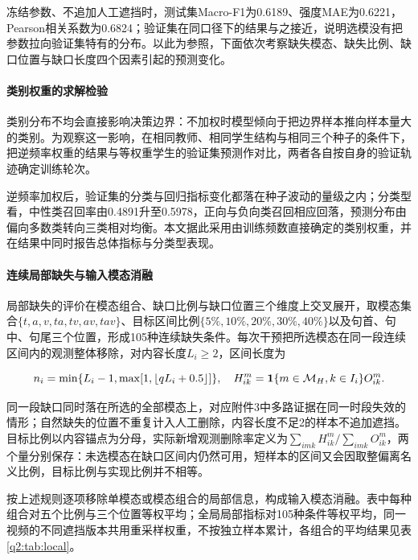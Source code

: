 冻结参数、不追加人工遮挡时，测试集Macro-F1为0.6189、强度MAE为0.6221，Pearson相关系数为0.6824；验证集在同口径下的结果与之接近，说明选模没有把参数拉向验证集特有的分布。以此为参照，下面依次考察缺失模态、缺失比例、缺口位置与缺口长度四个因素引起的预测变化。

\paragraph{类别权重的求解检验}

类别分布不均会直接影响决策边界：不加权时模型倾向于把边界样本推向样本量大的类别。为观察这一影响，在相同教师、相同学生结构与相同三个种子的条件下，把逆频率权重的结果与等权重学生的验证集预测作对比，两者各自按自身的验证轨迹确定训练轮次。

逆频率加权后，验证集的分类与回归指标变化都落在种子波动的量级之内；分类型看，中性类召回率由0.4891升至0.5978，正向与负向类召回相应回落，预测分布由偏向多数类转向三类相对均衡。本文据此采用由训练频数直接确定的类别权重，并在结果中同时报告总体指标与分类型表现。

\paragraph{连续局部缺失与输入模态消融}

局部缺失的评价在模态组合、缺口比例与缺口位置三个维度上交叉展开，取模态集合$\{t,a,v,ta,tv,av,tav\}$、目标区间比例$\{5\%,10\%,20\%,30\%,40\%\}$以及句首、句中、句尾三个位置，形成105种连续缺失条件。每次干预把所选模态在同一段连续区间内的观测整体移除，对内容长度$L_i\ge2$，区间长度为

\begin{equation}n_i=\min\{L_i-1,\max[1,\lfloor qL_i+0.5\rfloor]\},\quad H^m_{ik}=\mathbf 1\{m\in\mathcal M_H,k\in I_i\}O^m_{ik}.\end{equation}

同一段缺口同时落在所选的全部模态上，对应附件3中多路证据在同一时段失效的情形；自然缺失的位置不重复计入人工删除，内容长度不足2的样本不追加遮挡。目标比例以内容锚点为分母，实际新增观测删除率定义为$\sum_{imk}H^m_{ik}/\sum_{imk}O^m_{ik}$，两个量分别保存：未选模态在缺口区间内仍然可用，短样本的区间又会因取整偏离名义比例，目标比例与实现比例并不相等。

按上述规则逐项移除单模态或模态组合的局部信息，构成输入模态消融。表中每种组合对五个比例与三个位置等权平均；全局局部指标对105种条件等权平均，同一视频的不同遮挡版本共用重采样权重，不按独立样本累计，各组合的平均结果见表\ref{q2:tab:local}。

